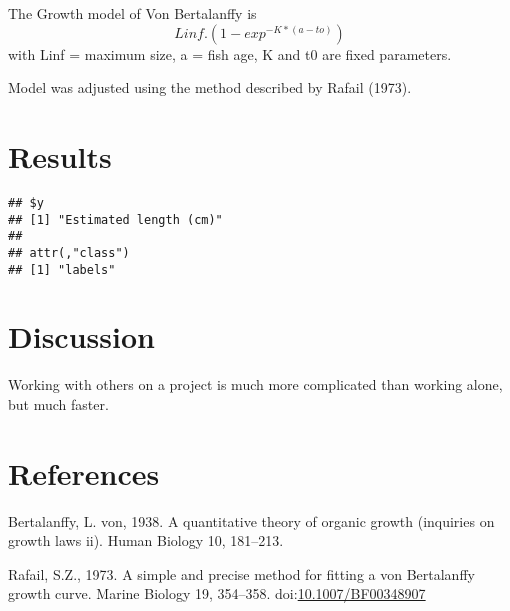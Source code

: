 \documentclass[]{elsarticle} %
\newlength{\cslhangindent}
\newenvironment{cslreferences}%
  {\setlength{\parindent}{0pt}%
  \everypar{\setlength{\hangindent}{\cslhangindent}}\ignorespaces}%
  {\par}
\begin{document}
The Growth model of Von Bertalanffy is \[Linf.(1-exp^{-K*(a-to)})\] with
Linf = maximum size, a = fish age, K and t0 are fixed parameters.

Model was adjusted using the method described by Rafail (1973).

\hypertarget{results}{%
\section{Results}\label{results}}

\begin{verbatim}
## $y
## [1] "Estimated length (cm)"
## 
## attr(,"class")
## [1] "labels"
\end{verbatim}

\hypertarget{discussion}{%
\section{Discussion}\label{discussion}}

Working with others on a project is much more complicated than working
alone, but much faster.

\hypertarget{references}{%
\section*{References}\label{references}}

\hypertarget{refs}{}
\begin{cslreferences}
\leavevmode\hypertarget{ref-Bertalanffy1938}{}%
Bertalanffy, L. von, 1938. A quantitative theory of organic growth
(inquiries on growth laws ii). Human Biology 10, 181--213.

\leavevmode\hypertarget{ref-rafail_simple_1973}{}%
Rafail, S.Z., 1973. A simple and precise method for fitting a von
Bertalanffy growth curve. Marine Biology 19, 354--358.
doi:\href{https://doi.org/10.1007/BF00348907}{10.1007/BF00348907}
\end{cslreferences}
\end{document}
